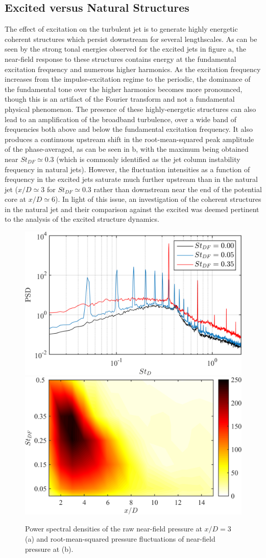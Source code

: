 \subsection{Excited versus Natural Structures}
The effect of excitation on the turbulent jet is to generate highly energetic coherent structures which persist downstream for several lengthscales.
As can be seen by the strong tonal energies observed for the excited jets in figure a, the near-field response to these structures contains energy at the fundamental excitation frequency and numerous higher harmonics.
As the excitation frequency increases from the impulse-excitation regime to the periodic, the dominance of the fundamental tone over the higher harmonics becomes more pronounced, though this is an artifact of the Fourier transform and not a fundamental physical phenomenon. 
The presence of these highly-energetic structures can also lead to an amplification of the broadband turbulence, over a wide band of frequencies both above and below the fundamental excitation frequency.
It also produces a continuous upstream shift in the root-mean-squared peak amplitude of the phase-averaged, as can be seen in b, with the maximum being obtained near $St_{DF} \simeq 0.3$ (which is commonly identified as the jet column instability frequency in natural jets).
However, the fluctuation intensities as a function of frequency in the excited jets saturate much further upstream than in the natural jet ($x/D \simeq 3$ for $St_{DF} \simeq 0.3$ rather than downstream near the end of the potential core at $x/D \simeq 6$).
In light of this issue, an investigation of the coherent structures in the natural jet and their comparison against the excited was deemed pertinent to the analysis of the excited structure dynamics.
\begin{figure}
	\centering
	\includegraphics[width=0.44\linewidth]{Figures/sect_nearfield_spectra.png}
	\includegraphics[width=0.46\linewidth]{Figures/sect_nearfield_prms.png}
	\caption{Power spectral densities of the raw near-field pressure at $x/D = 3$ (a) and root-mean-squared pressure fluctuations of near-field pressure at (b).}
	\label{fig:sect_nearfield_spectra_prms}
\end{figure}

